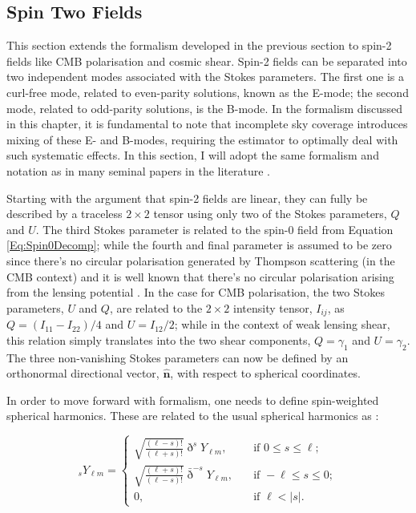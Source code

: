 \subsection{Spin Two Fields}\label{Sec:BPL:Spin-2_Form}
This section extends the formalism developed in the previous section to spin-2 fields like CMB polarisation and cosmic shear. Spin-2 fields can be separated into two independent modes associated with the Stokes parameters. The first one is a curl-free mode, related to even-parity solutions, known as the E-mode; the second mode, related to odd-parity solutions, is the B-mode. In the formalism discussed in this chapter, it is fundamental to note that incomplete sky coverage introduces mixing of these E- and B-modes, requiring the estimator to optimally deal with such systematic effects. In this section, I will adopt the same formalism and notation as in many seminal papers in the literature \citep{Seljak1997,Taylor2008,Hikage2011}.

\qquad Starting with the argument that spin-2 fields are linear, they can fully be described by a traceless $2 \times 2$ tensor using only two of the Stokes parameters, $Q$ and $U$. The third Stokes parameter is related to the spin-0 field from Equation \eqref{Eq:Spin0Decomp}; while the fourth and final parameter is assumed to be zero since there's no circular polarisation generated by Thompson scattering (in the CMB context) and it is well known that there's no circular polarisation arising from the lensing potential \citep{2005astro.ph..9252S,2017SchpJ..1232440B}. In the case for CMB polarisation, the two Stokes parameters, $U$ and $Q$, are related to the $2\times 2$ intensity tensor, $I_{ij}$, as $Q=(I_{11}-I_{22})/4$ and $U=I_{12}/2$; while in the context of weak lensing shear, this relation simply translates into the two shear components, $Q=\gamma_1$ and $U=\gamma_2$. The three non-vanishing Stokes parameters can now be defined by an orthonormal directional vector, $\hat{\mathbf{n}}$, with respect to spherical coordinates. 

\qquad In order to move forward with formalism, one needs to define spin-weighted spherical harmonics. These are related to the usual spherical harmonics as \citep{Jost,2019NaMaster}:

\begin{equation}
    _s Y_{\ell m} = \begin{cases} 
                    \sqrt{\frac{(\ell -s)!}{(\ell+s)!}} \eth^s Y_{\ell m}, \quad & \text{if } 0\leq s \leq \ell ; \\
                    \sqrt{\frac{(\ell +s)!}{(\ell-s)!}} \bar{\eth}^{-s} Y_{\ell m}, \quad & \text{if } -\ell \leq s \leq 0 ; \\
                    0, \quad & \text{if } \ell < |s|.
                    \end{cases}
\end{equation}


